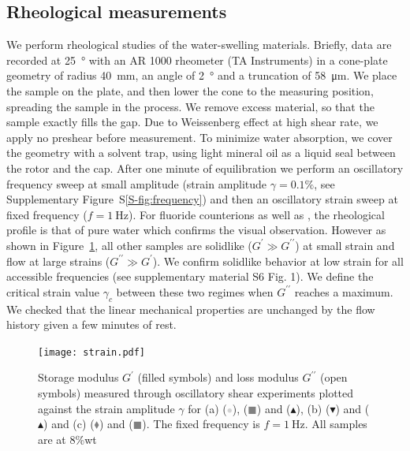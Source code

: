 \documentclass[journal=jacsat,manuscript=article]{achemso}
\begin{document}
\subsection{Rheological measurements}
We perform rheological studies of the water-swelling materials. Briefly, data are recorded at \SI{25}{\degree} with an AR 1000 rheometer (TA Instruments) in a cone-plate geometry of radius \SI{40}{\milli\metre}, an angle of \SI{2}{\degree} and a truncation of \SI{58}{\micro\metre}\cite{Macosko1994,Larson1999}. We place the sample on the plate, and then lower the cone to the measuring position, spreading the sample in the process. We remove excess material, so that the sample exactly fills the gap. Due to Weissenberg effect at high shear rate, we apply no preshear before measurement. To minimize water absorption, we cover the geometry with a solvent trap, using light mineral oil as a liquid seal between the rotor and the cap. After one minute of equilibration we perform an oscillatory frequency sweep at small amplitude (strain amplitude $\gamma=0.1\%$, see Supplementary Figure~S\ref{S-fig:frequency}) and then an oscillatory strain sweep at fixed frequency ($f=\SI{1}{\hertz}$). For fluoride counterions as well as , the rheological profile is that of pure water which confirms the visual observation. However as shown in Figure~\ref{fig:strain}, all other samples are solidlike ($G^\prime \gg G^{\prime\prime}$) at small strain and flow at large strains ($G^{\prime\prime} \gg G^\prime$). We confirm solidlike behavior at low strain for all accessible frequencies (see supplementary material S6 Fig. 1). We define the critical strain value $\gamma_c$ between these two regimes when $G^{\prime\prime}$ reaches a maximum. We checked that the linear mechanical properties are unchanged by the flow history given a few minutes of rest. %

\begin{figure}
\texttt{[image: strain.pdf]}
\caption{Storage modulus $G^\prime$ (filled symbols) and loss modulus $G^{\prime\prime}$ (open symbols) measured through oscillatory shear experiments plotted against the strain amplitude $\gamma$ for (a)  (\textcolor{lightgray}{$\bullet$}),  (\textcolor{gray}{$\blacksquare$}) and  ($\blacktriangle$), (b)  ($\blacktriangledown$) and  ($\blacktriangle$) and (c)  (\textcolor{gray}{$\blacklozenge$}) and  (\textcolor{gray}{$\blacksquare$}). The fixed frequency is $f=\SI{1}{\hertz}$. All samples are at 8\%wt }
\label{fig:strain}
\end{figure}
\end{document}
